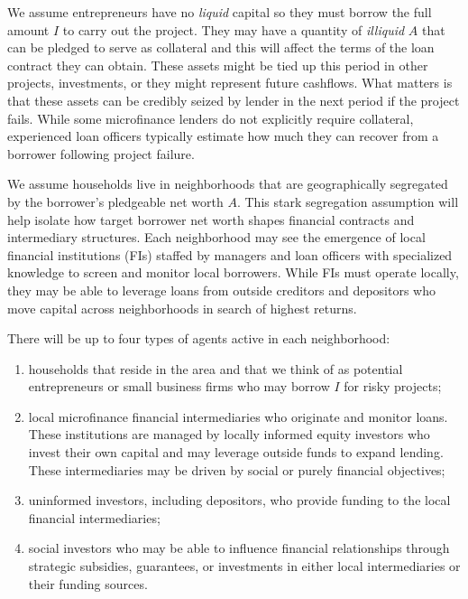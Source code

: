 \documentclass[letterpaper, 12pt]{article}
\begin{document}
We assume entrepreneurs have no \emph{liquid} capital so they must borrow the full amount $I$ to carry out the project. They may have a quantity of \emph{illiquid} $A$ that can be pledged to serve as collateral and this will affect the terms of the loan contract they can obtain. These assets might be tied up this period in other projects, investments, or they might represent future cashflows. What matters is that these assets can be credibly seized by lender in the next period if the project fails. While some microfinance lenders do not explicitly require collateral, experienced loan officers typically estimate how much they can recover from a borrower following project failure.

We assume households live in neighborhoods that are geographically segregated by the borrower's pledgeable net worth $A$. This stark segregation assumption will help isolate how target borrower net worth shapes financial contracts and intermediary structures. Each neighborhood may see the emergence of local financial institutions (FIs) staffed by managers and loan officers with specialized knowledge to screen and monitor local borrowers. While FIs must operate locally, they may be able to leverage loans from outside creditors and depositors who move capital across neighborhoods in search of highest returns.

There will be up to four types of agents active in each neighborhood:
\begin{enumerate}[label=\alph*.]

    \item households that reside in the area and that we think of as potential entrepreneurs or small business firms who may borrow $I$ for risky projects;
    
    \item local microfinance financial intermediaries who originate and monitor loans. These institutions are managed by locally informed equity investors who invest their own capital and may leverage outside funds to expand lending. These intermediaries may be driven by social or purely financial objectives;

   \item uninformed investors, including depositors, who provide funding to the local financial intermediaries;

  \item  social investors who may be able to influence financial relationships through strategic subsidies, guarantees, or investments in either local intermediaries or their funding sources.
\end{enumerate}
\end{document}
